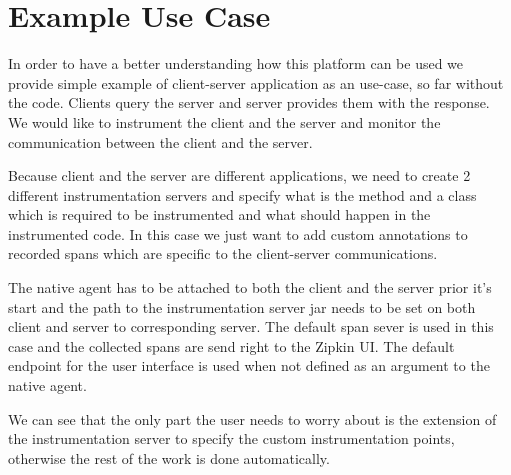 \section{Example Use Case}
In order to have a better understanding how this platform can be used we provide simple example of client-server application as an use-case, so far without the code. Clients query the server and server provides them with the response. We would like to instrument the client and the server and monitor the communication between the client and the server.

Because client and the server are different applications, we need to create 2 different instrumentation servers and specify what is the method and a class which is required to be instrumented and what should happen in the instrumented code. In this case we just want to add custom annotations to recorded spans which are specific to the client-server communications.

The native agent has to be attached to both the client and the server prior it's start and the path to the instrumentation server jar needs to be set on both client and server to corresponding server. The default span sever is used in this case and the collected spans are send right to the Zipkin UI. The default endpoint for the user interface is used when not defined as an argument to the native agent.

We can see that the only part the user needs to worry about is the extension of the instrumentation server to specify the custom instrumentation points, otherwise the rest of the work is done automatically.